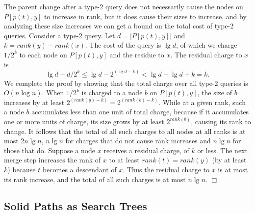 \documentclass[twoside,leqno,twocolumn]{article}
\newcommand{\proofend}{$\Box$\\}
\newcommand{\rank}{\mathit{rank}}
\begin{document}
The parent change after a type-2 query does not necessarily cause the nodes on $P[p(t), y]$ to increase in rank, but it does cause their sizes to increase, and by analyzing these size increases we can get a bound on the total cost of type-2 queries.  Consider a type-2 query.  Let $d = |P[p(t), y]|$ and $k = \rank(y) - \rank(x)$.  The cost of the query is $\lg d$, of which we charge $1/2^k$ to each node on $P[p(t), y]$ and the residue to $x$.  The residual charge to $x$ is
$$
\lg d - d/2^k \le \lg d - 2^{(\lg d - k)} < \lg d - \lg d + k = k.
$$
We complete the proof by showing that the total charge over all type-2 queries is $O(n \log n)$.  When $1/2^k$ is charged to a node $b$ on $P[p(t), y]$, the size of $b$ increases by at least $2^{(rank(y) - k)} = 2^{(rank(b) - k)}$.  While at a given rank, such a node $b$ accumulates less than one unit of total charge, because if it accumulates one or more units of charge, its size grows by at least $2^{\rank(b)}$, causing its rank to change.  It follows that the total of all such charges to all nodes at all ranks is at most $2n \lg n$, $n \lg n$ for charges that do not cause rank increases and $n \lg n$ for those that do.  Suppose a node $x$ receives a residual charge, of $k$ or less.  The next merge step increases the rank of $x$ to at least $\rank(t) = \rank(y)$ (by at least $k$) because $t$ becomes a descendant of $x$.  Thus the residual charge to $x$ is at most its rank increase, and the total of all such charges is at most $n \lg n$.  \proofend



\subsection{Solid Paths as Search Trees}
\label{sec:merge-representation}
\end{document}
